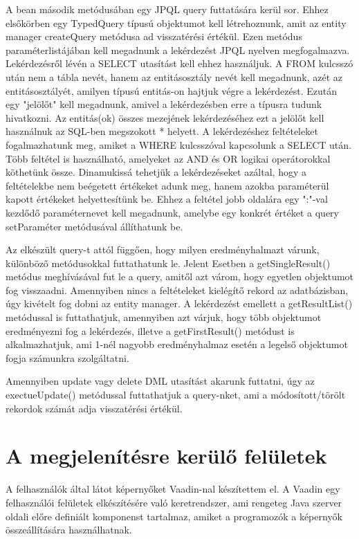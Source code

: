 \documentclass[centeredchapter]{thesis-ekf}
\theoremstyle{definition}
\theoremstyle{remark}
\begin{document}
A bean második metódusában egy JPQL query futtatására kerül sor. Ehhez elsőkörben egy TypedQuery típusú objektumot kell létrehoznunk, amit az entity manager createQuery metódusa ad visszatérési értékül. Ezen metódus paraméterlistájában kell megadnunk a lekérdezést JPQL nyelven megfogalmazva. Lekérdezésről lévén a SELECT utasítást kell ehhez használjuk. A FROM kulcsszó után nem a tábla nevét, hanem az entitásosztály nevét kell megadnunk, azét az entitásosztályét, amilyen típusú entitás-on hajtjuk végre a lekérdezést. Ezután egy "jelölőt" kell megadnunk, amivel a lekérdezésben erre a típusra tudunk hivatkozni. Az entitás(ok) összes mezejének lekérdezéséhez ezt a jelölőt kell használnuk az SQL-ben megszokott * helyett. A lekérdezéshez feltételeket fogalmazhatunk meg, amiket a WHERE kulcsszóval kapcsolunk a SELECT után. Több feltétel is használható, amelyeket az AND és OR logikai operátorokkal köthetünk össze. Dinamukissá tehetjük a lekérdezéseket azáltal, hogy a feltételekbe nem beégetett értékeket adunk meg, hanem azokba paraméterül kapott értékeket helyettesítünk be. Ehhez a feltétel jobb oldalára egy ":"-val kezdődő paraméternevet kell megadnunk, amelybe egy konkrét értéket a query setParaméter metódusával állíthatunk be.

Az elkészült query-t attól függően, hogy milyen eredményhalmazt várunk, különböző metódusokkal futtathatunk le. Jelent Esetben a getSingleResult() metódus meghívásával fut le a query, amitől azt várom, hogy egyetlen objektumot fog visszaadni. Amennyiben nincs a feltételeket kielégítő rekord az adatbázisban, úgy kivételt fog dobni az entity manager.
A lekérdezést emellett a getResultList() metódussal is futtathatjuk, amennyiben azt várjuk, hogy több objektumot eredményezni fog a lekérdezés, illetve a getFirstResult() metódust is alkalmazhatjuk, ami 1-nél nagyobb eredményhalmaz esetén a legelső objektumot fogja számunkra szolgáltatni.

Amennyiben update vagy delete DML utasítást akarunk futtatni, úgy az exectueUpdate() metódussal futtathatjuk a query-nket, ami a módosított/törölt rekordok számát adja visszatérési értékül. 

\newpage
\section{A megjelenítésre kerülő felületek}

A felhasználók által látot képernyőket Vaadin-nal készítettem el. A Vaadin egy felhasználói felületek elkészítésére való keretrendszer, ami rengeteg Java szerver oldali előre definiált komponenst tartalmaz, amiket a programozók a képernyők összeállítására használhatnak. 
\end{document}
